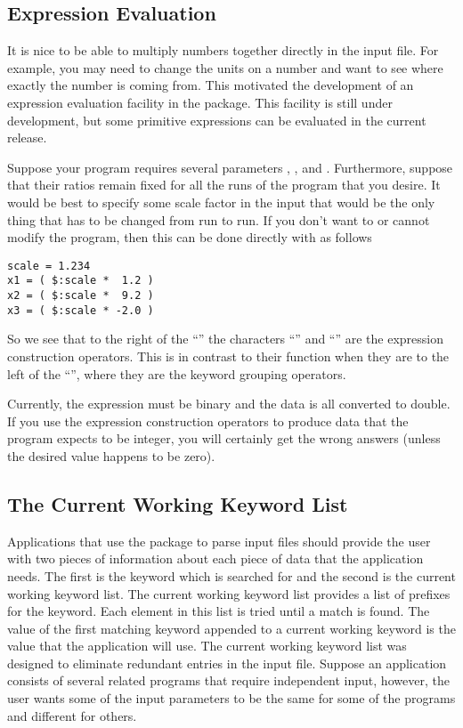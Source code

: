 \subsection{Expression Evaluation}
It is nice to be able to multiply numbers together directly in
the input file.  For example, you may need to change the units
on a number and want to see where exactly the number is coming
from.  This motivated the development of an expression evaluation
facility in the \libip{} package.  This facility is still under
development, but some primitive expressions can be evaluated in
the current release.

Suppose your program requires several parameters , , and
.
Furthermore, suppose that their ratios remain fixed for all the runs
of the program that you desire.  It would be best to specify some
scale factor in the input that would be the only thing that has
to be changed from run to run.  If you don't want to or cannot modify
the program, then this can be done directly with \libip{} as follows
\begin{verbatim}
scale = 1.234
x1 = ( $:scale *  1.2 )
x2 = ( $:scale *  9.2 )
x3 = ( $:scale * -2.0 )
\end{verbatim}
So we see that to the right of the ``\lit{=}'' the characters ``\lit{(}''
and ``\lit{)}'' are the expression construction operators.  This is
in contrast to their function when they are to the left of the
``\lit{=}'', where they
are the keyword grouping operators.

Currently, the expression must be binary and the data is all converted
to double.  If you use the expression construction operators to produce
data that the program expects to be integer, you will certainly get
the wrong answers (unless the desired value happens to be zero).

\subsection{The Current Working Keyword List}\label{cwklist}
Applications that use the \libip{} package to parse input files should
provide the user with two pieces of information about each piece of
data that the application needs.  The first is the keyword which is
searched for and the second is the current working keyword list.
The current working keyword list provides a list of prefixes for
the keyword.  Each element in this list is tried until a match is
found.  The value of the first matching keyword appended to a current
working keyword is the value that the application will use.  The
current working keyword list was designed to eliminate redundant
entries in the input file.  Suppose an application
consists of several related programs that require independent input,
however, the user wants some of the input parameters to be the same
for some of the programs and different for others.

